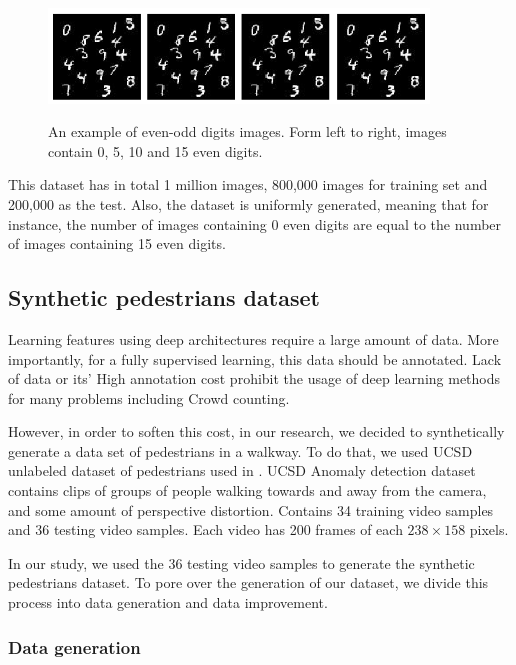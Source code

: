 \begin{figure}[H]
	\centering
	{\includegraphics[width=0.9\textwidth]{images/l2cmnist}}
		\caption{An example of even-odd digits images. Form left to right, images contain 0, 5, 10 and 15 even digits.}
	\label{fig:l2cmnist}
\end{figure}

\indent This dataset has in total 1 million images, 800,000 images for training set and 200,000 as the test. Also, the dataset is uniformly generated, meaning that for instance, the number of images containing 0 even digits are equal to the number of images containing 15 even digits.  

\subsection{Synthetic pedestrians dataset}
\label{subsec:synped}
Learning features using deep architectures require a large amount of data. More importantly, for a fully supervised learning, this data should be annotated. Lack of data or its' High annotation cost prohibit the usage of deep learning methods for many problems including Crowd counting. 

\indent However, in order to soften this cost, in our research, we decided to synthetically generate a data set of pedestrians in a walkway. To do that, we used UCSD unlabeled dataset of pedestrians used in \cite{chan2009analysis, mahadevan2010anomaly, li2014anomaly}. UCSD Anomaly detection dataset contains clips of groups of people walking towards and away from the camera, and some amount of perspective distortion. Contains 34 training video samples and 36 testing video samples. Each video has 200 frames of each $238\times158$ pixels.


\indent In our study, we used the 36 testing video samples to generate the synthetic pedestrians dataset. To pore over the generation of our dataset, we divide this process into data generation and data improvement.

  
\subsubsection{Data generation}

